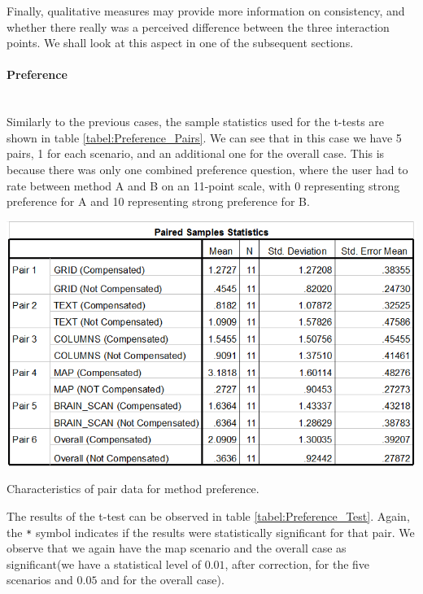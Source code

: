 \documentclass[]{article}
\begin{document}
Finally, qualitative measures may provide more information on consistency, and whether there really was a perceived difference between the three interaction points. We shall look at this aspect in one of the subsequent sections.
\\
\paragraph{Preference}\mbox{}\\

Similarly to the previous cases, the sample statistics used for the t-tests are shown in table \ref{tabel:Preference_Pairs}. We can see that in this case we have 5 pairs, 1 for each scenario, and an additional one for the overall case. This is because there was only one combined preference question, where the user had to rate between method A and B on an 11-point scale, with 0 representing strong preference for A and 10 representing strong preference for B. 

\begin{table}[!h]
  \includegraphics[width=\linewidth]{figures/results/Preference_Pairs.PNG}
  \caption{Characteristics of pair data for method preference.}
  \label{tabel:Preference_Pairs}
\end{table}

The results of the t-test can be observed in table \ref{tabel:Preference_Test}. Again, the \verb|*| symbol indicates if the results were statistically significant for that pair. We observe that we again have the map scenario and the overall case as significant(we have a statistical level of $0.01$, after correction, for the five scenarios and $0.05$ and for the overall case).
\end{document}
